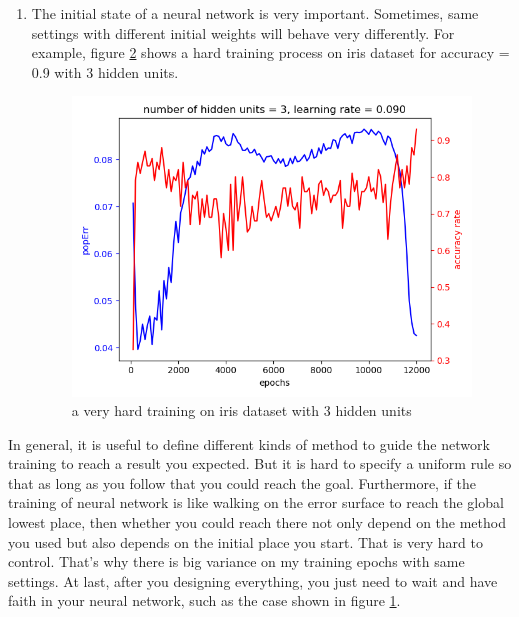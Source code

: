 \documentclass[11pt]{article}
\begin{document}
\begin{enumerate}
\begin{itemize}
\begin{figure}[htb]
\caption{It is lucky that after a long time training, the neural network achieved a high accuracy on 4:4:1 dataset  \label{fig-441}}
\end{figure}
\item 8:3:8: The popErr could be reduced to 0.09, the accuracy is around 0.11 \textasciitilde{} 0.14.
\item iris: After increasing hidden units to 6, the training to high accuracy becomes faster and more steady.
\end{itemize}

\item The initial state of a neural network is very important. Sometimes, same settings with different initial weights will behave very differently. For example, figure \ref{fig-iris-hard-training} shows a hard training process on iris dataset for accuracy = 0.9 with 3 hidden units. 
\begin{figure}[htb]
\centering
\includegraphics[width=.9\linewidth]{./popErr_vs_accuracy_on_iris_hard_training.png}
\caption{a very hard training on iris dataset with 3 hidden units \label{fig-iris-hard-training}}
\end{figure}
\end{enumerate}


In general, it is useful to define different kinds of method to guide the network training to reach a result you expected. But it is hard to specify a uniform rule so that as long as you follow that you could reach the goal. Furthermore, if the training of neural network is like walking on the error surface to reach the global lowest place, then whether you could reach there not only depend on the method you used but also depends on the initial place you start. That is very hard to control. That's why there is big variance on my training epochs with same settings. At last, after you designing everything, you just need to wait and have faith in your neural network, such as the case shown in figure \ref{fig-441}.
\end{document}
